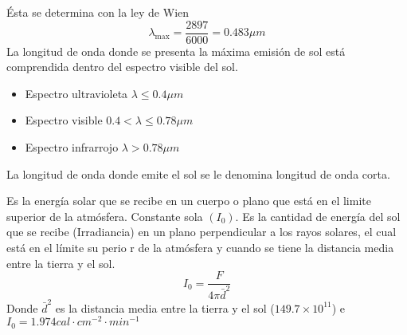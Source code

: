 Ésta se determina con la ley de Wien
\begin{equation}
    \lambda_{\max} = \frac{2897}{6000} = 0.483\mu m
\end{equation}
La longitud de onda donde se presenta la máxima emisión de sol está comprendida dentro del espectro visible del sol.
\begin{itemize}
    \item Espectro ultravioleta $\lambda \leq 0.4\mu m$
    \item Espectro visible $0.4 < \lambda \leq 0.78\mu m$
    \item Espectro infrarrojo $\lambda > 0.78\mu m$
\end{itemize}
La longitud de onda donde emite el sol se le denomina longitud de onda corta.
\begin{definition}
    Es la energía solar que se recibe en un cuerpo o plano que está en el limite superior de la atmósfera.
Constante sola $(I_0)$. Es la cantidad de energía del sol que se recibe (Irradiancia) en un plano perpendicular a los rayos solares, el cual está en el límite su perio r de la atmósfera y cuando se tiene la distancia media entre la tierra y el sol.
\begin{equation}
    I_0 = \frac{F}{4 \pi \bar{d}^2}
\end{equation}
Donde $\bar{d}^2$ es la distancia media entre la tierra y el sol ($149.7\times 10^{11}$) e $I_0=1.974 cal \cdot cm^{-2}\cdot min^{-1}$
\end{definition}


